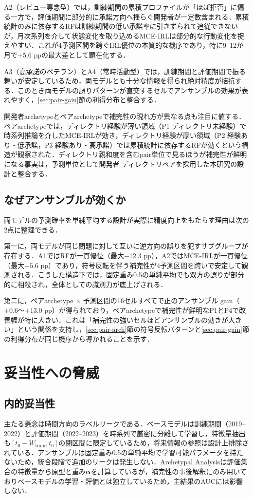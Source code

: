 \documentclass[submit,noauthor,ses,dvipdfmx]{ipsj}
\begin{document}
A2（レビュー専念型）では，訓練期間の累積プロファイルが「ほぼ拒否」に偏る一方で，評価期間に部分的に承諾方向へ揺らぐ開発者が一定数含まれる．累積統計のみに依存するRFは訓練期間の低い承諾率に引きずられて追従できないが，月次系列を介して状態変化を取り込めるMCE-IRLは部分的な行動変化を捉えやすい．これが4予測区間を跨ぐIRL優位の本質的な機序であり，特に9--12か月で$+5.6$ ppの最大差として顕在化する．

A3（高承諾のベテラン）とA4（常時活動型）では，訓練期間と評価期間で振る舞いが安定しているため，両モデルとも十分な情報を得られ絶対精度が拮抗する．このとき両モデルの誤りパターンが直交するセルでアンサンブルの効果が表れやすく，\ref{sec:pair-gain}節の利得分布と整合する．

開発者archetypeとペアarchetypeで補完性の現れ方が異なる点も注目に値する．ペアarchetypeでは，ディレクトリ経験が薄い領域（P1 ディレクトリ未経験）で時系列推論を介したMCE-IRLが効き，ディレクトリ経験が厚い領域（P2 経験あり・低承諾，P3 経験あり・高承諾）では累積統計に依存するRFが効くという構造が観察された．ディレクトリ親和度を含むpair単位で見るほうが補完性が鮮明になる事実は，予測単位として開発者-ディレクトリペアを採用した本研究の設計と整合する．

\subsection{なぜアンサンブルが効くか}
両モデルの予測確率を単純平均する設計が実際に精度向上をもたらす理由は次の2点に整理できる．

第一に，両モデルが同じ問題に対して互いに逆方向の誤りを犯すサブグループが存在する．A1ではRFが一貫優位（最大$-12.3$ pp），A2ではMCE-IRLが一貫優位（最大$+5.6$ pp）であり，符号反転を伴う補完性が4予測区間を跨いで安定して観測される．こうした構造下では，固定重み0.5の単純平均でも双方の誤りが部分的に相殺され，全体としての識別力が底上げされる．

第二に，ペアarchetype $\times$ 予測区間の16セルすべてで正のアンサンブル gain（$+0.6$〜$+13.0$ pp）が得られており，ペアarchetypeで補完性が鮮明なP1とP4で改善幅が特に大きい．これは「補完性の強いセルほどアンサンブルの効きが大きい」という関係を支持し，\ref{sec:pair-arch}節の符号反転パターンと\ref{sec:pair-gain}節の利得分布が同じ機序から導かれることを示す．

\section{妥当性への脅威}\label{sec:validity}
\subsection{内的妥当性}
主たる懸念は時間方向のラベルリークである．ベースモデルは訓練期間（2019--2022）と評価期間（2022--2023）を時系列で厳密に分離して学習し，特徴量抽出も$[t_0 - W_{\mathrm{train}}, t_0]$の閉区間に限定しているため，将来情報の参照は設計上排除されている．アンサンブルは固定重み0.5の単純平均で学習可能パラメータを持たないため，統合段階で追加のリークは発生しない．Archetypal Analysisは評価集合の特徴量から原型と重み$\bm{\alpha}$を計算しているが，補完性の事後解釈にのみ用いておりベースモデルの学習・評価とは独立しているため，主結果のAUCには影響しない．
\end{document}
